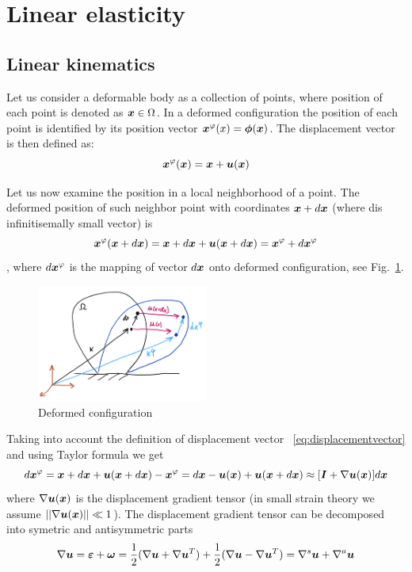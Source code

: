 \section{Linear elasticity}
\subsection{Linear kinematics}
Let us consider a deformable body as a collection of points, where position of each point is denoted as $\x\in\Omega$. In a deformed configuration the position of each point is identified by its position vector $\xd(x) = \mbf{\phi}(\x)$. The displacement vector is then defined as:
\begin{equation}
  \label{eq:displacementvector}
  \xd(\x) = \x + \du(\x)  
\end{equation}

Let us now examine the position in a local neighborhood of a point. The deformed position of such neighbor point with coordinates $\x+d\x$ (where d\x is infinitisemally small vector) is
$$\xd(\x+d\x) = \x+d\x+\du(\x+d\x) = \xd + d\xd$$,
where $d\xd$ is the mapping of vector $d\x$ onto deformed configuration, see Fig.~\ref{fig:deformedconfiguration}.
\begin{figure}
  \begin{center}
    \includegraphics[width=0.5\textwidth]{figs/deformedconfiguration.png}
  \end{center}
  \label{fig:deformedconfiguration}
  \caption{Deformed configuration}
\end{figure}
Taking into account the definition of displacement vector ~\ref{eq:displacementvector} and using Taylor formula we get
\begin{equation}
  d\xd = \x+d\x+\du(\x+d\x)-\xd = d\x-\du(\x)+\du(\x+d\x) \approx [\mbf{I}+\grad\du(\x)]d\x
\end{equation}
where $\grad\du(\x)$ is the displacement gradient tensor (in small strain theory we assume $\vert\vert\grad\du(\x)\vert\vert \ll 1$).
The displacement gradient tensor can be decomposed into symetric and antisymmetric parts
$$
\grad\du = \mbf{\eps}+\mbf{\omega}={1\over 2}(\grad\du+\grad\du^T)+{1\over 2}(\grad\du-\grad\du^T) = \grad^s\mbf{u}+\grad^a\mbf{u}
$$

